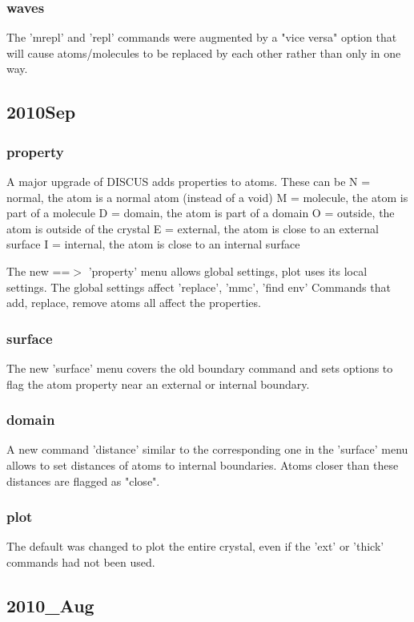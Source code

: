 \subsubsection{waves}
\par
The 'mrepl' and 'repl' commands were augmented by a "vice versa" 
option that will cause atoms/molecules to be replaced by each other 
rather than only in one way. 
\subsection*{2010Sep}
\subsubsection{property}
\par
A major upgrade of DISCUS adds properties to atoms. These can be 
N = normal,   the atom is a normal atom (instead of a void) 
M = molecule, the atom is part of a molecule 
D = domain,   the atom is part of a domain 
O = outside,  the atom is outside of the crystal 
E = external, the atom is close to an external surface 
I = internal, the atom is close to an internal surface 
\par
The new ==$> $ 'property' menu allows global settings, plot uses its local 
settings. 
The global settings affect 'replace', 'mmc', 'find env' 
Commands that add, replace, remove atoms all affect the properties. 
\subsubsection{surface}
\par
The new 'surface' menu covers the old boundary command and sets 
options to flag the atom property near an external or internal boundary. 
\subsubsection{domain}
\par
A new command 'distance' similar to the corresponding one in the 
'surface' menu allows to set distances of atoms to internal 
boundaries. Atoms closer than these distances are flagged as "close". 
\subsubsection{plot}
\par
The default was changed to plot the entire crystal, even if the 
'ext' or 'thick' commands had not been used. 
\subsection*{2010\_Aug}
